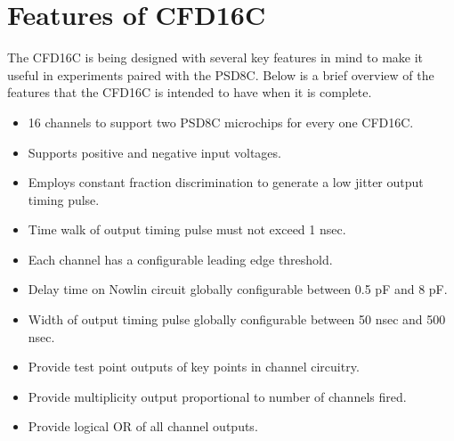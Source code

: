 \documentclass[12pt,oneside,final]{siuethesis}
\theoremstyle{definition}
\begin{document}
\section{Features of CFD16C}
\par The CFD16C is being designed with several key features in mind to make it useful in experiments paired with the PSD8C. Below is a brief overview of the features that the CFD16C is intended to have when it is complete.

\begin{itemize}
\item
16 channels to support two PSD8C microchips for every one CFD16C.
\item
Supports positive and negative input voltages.
\item
Employs constant fraction discrimination to generate a low jitter output timing pulse.
\item
Time walk of output timing pulse must not exceed 1 nsec.
\item
Each channel has a configurable leading edge threshold.
\item
Delay time on Nowlin circuit globally configurable between 0.5 pF and 8 pF.
\item
Width of output timing pulse globally configurable between 50 nsec and 500 nsec.
\item
Provide test point outputs of key points in channel circuitry.
\item
Provide multiplicity output proportional to number of channels fired.
\item
Provide logical OR of all channel outputs.
\end{itemize}
\end{document}
